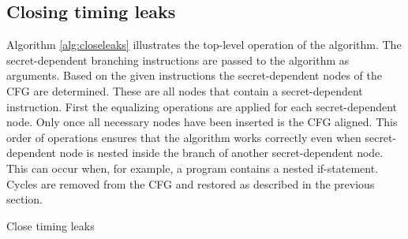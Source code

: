 \subsection{Closing timing leaks}
Algorithm \ref{alg:closeleaks} illustrates the top-level operation of the algorithm. 
The secret-dependent branching instructions are passed to the algorithm as arguments. 
Based on the given instructions the secret-dependent nodes of the CFG are determined. 
These are all nodes that contain a secret-dependent instruction. 
First the equalizing operations are applied for each secret-dependent node. 
Only once all necessary nodes have been inserted is the CFG aligned.
This order of operations ensures that the algorithm works correctly even when secret-dependent node is nested inside the branch of another secret-dependent node. 
This can occur when, for example, a program contains a nested if-statement. Cycles are removed from the CFG and restored as described in the previous section.


\begin{algorithm*}
    \SetAlgoLined
    \DontPrintSemicolon
    
    
    
    
    \caption{Close timing leaks}
    \label{alg:closeleaks}
\end{algorithm*}

